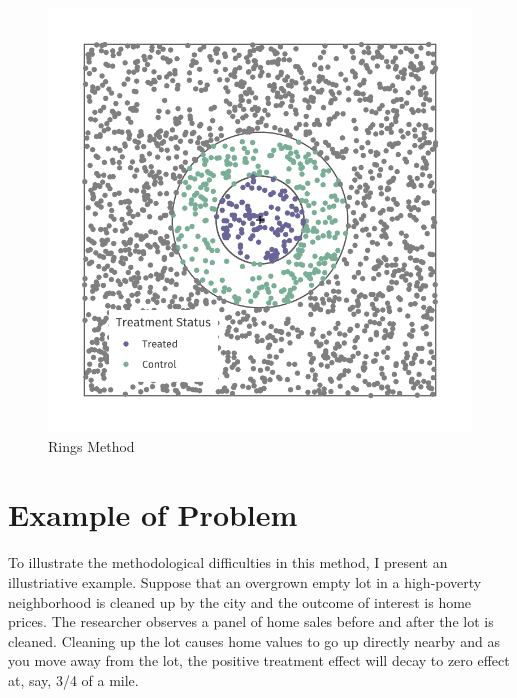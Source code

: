 \documentclass[10pt]{article}
\begin{document}
\begin{figure}[tb]
    \caption{Rings Method}
    \label{fig:example-id}

    \begin{adjustbox}{width = 0.4\textwidth, center}
        \includegraphics[width=\textwidth]{../figures/example_id.pdf}
    \end{adjustbox}
\end{figure}


\section{Example of Problem}

To illustrate the methodological difficulties in this method, I present an illustriative example. Suppose that an overgrown empty lot in a high-poverty neighborhood is cleaned up by the city and the outcome of interest is home prices. The researcher observes a panel of home sales before and after the lot is cleaned. Cleaning up the lot causes home values to go up directly nearby and as you move away from the lot, the positive treatment effect will decay to zero effect at, say, 3/4 of a mile.
\end{document}
